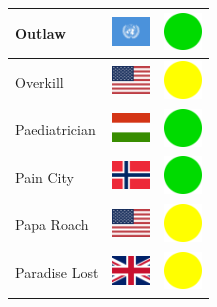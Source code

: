 \documentclass[12pt, a4paper, twoside]{report}
\begin{document}
\begin{center}
\begin{longtable}{|p{5cm}|p{2cm}|p{2cm}|}
 Outlaw                                                     & \includegraphics[width=1cm]{../img/flags/un} &   \includegraphics[width=1cm]{../likes/y} \\ \hline
 Overkill                                                   & \includegraphics[width=1cm]{../img/flags/us} &   \includegraphics[width=1cm]{../likes/m} \\ \hline
 Paediatrician                                              & \includegraphics[width=1cm]{../img/flags/hu} &   \includegraphics[width=1cm]{../likes/y} \\ \hline
 Pain City                                                  & \includegraphics[width=1cm]{../img/flags/no} &   \includegraphics[width=1cm]{../likes/y} \\ \hline
 Papa Roach                                                 & \includegraphics[width=1cm]{../img/flags/us} &   \includegraphics[width=1cm]{../likes/m} \\ \hline
 Paradise Lost                                              & \includegraphics[width=1cm]{../img/flags/gb} &   \includegraphics[width=1cm]{../likes/m} \\ \hline

\end{longtable}
\end{center}
\end{document}
